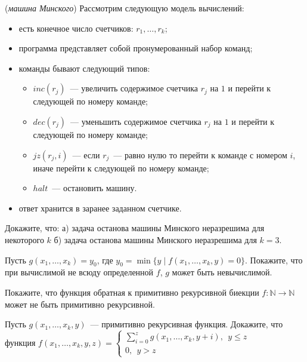 \setcounter{curtask}{24}


\begin{task} ({\it машина Минского})
    Рассмотрим следующую модель вычислений:
    \begin{itemize}
	    \item есть конечное число счетчиков: $r_1, \dots, r_k$;
    	\item программа представляет собой пронумерованный набор
    		команд;
    	\item команды бывают следующий типов:
		    \begin{itemize}
        	    \item $inc(r_j)$~--- увеличить содержимое счетчика
		            $r_j$ на $1$ и перейти к следующей по номеру команде;
                \item $dec(r_j)$~--- уменьшить содержимое счетчика
		            $r_j$ на $1$ и перейти к следующей по номеру команде;
               	\item $jz(r_j, i)$~--- если $r_j$~--- равно нулю то
            		перейти к команде с номером $i$, иначе перейти к
                    следующей по номеру команде;
                \item $halt$~--- остановить машину.
		    \end{itemize}
       	\item ответ хранится в заранее заданном счетчике.
    \end{itemize}

    Докажите, что:
    а) задача останова машины Минского неразрешима для некоторого $k$
    б) задача останова машины Минского неразрешима для $k = 3$.
\end{task}

\begin{task}
    Пусть $g(x_1, \dots, x_k) = y_0$, где $y_0 = \min \{y \mid f(x_1,
      \dots, x_k, y) = 0\}$. Покажите, что при вычислимой не всюду
      определенной $f$, $g$ может быть невычислимой.
\end{task}

\begin{task}
    Покажите, что функция обратная к примитивно рекурсивной биекции
    $f: \mathbb{N} \rightarrow \mathbb{N}$
    может не быть примитивно рекурсивной.
\end{task}

\begin{task}
	Пусть $g(x_1, \dots, x_k, y)$~--- примитивно рекурсивная функция.
    Докажите, что функция $f(x_1, \dots, x_k, y, z) =
	\begin{cases}
		\sum\limits_{i = 0}^{z} g(x_1, \dots, x_k, y + i),~~ y \le z  \\
		0,~~ y > z
	\end{cases}$
\end{task}

